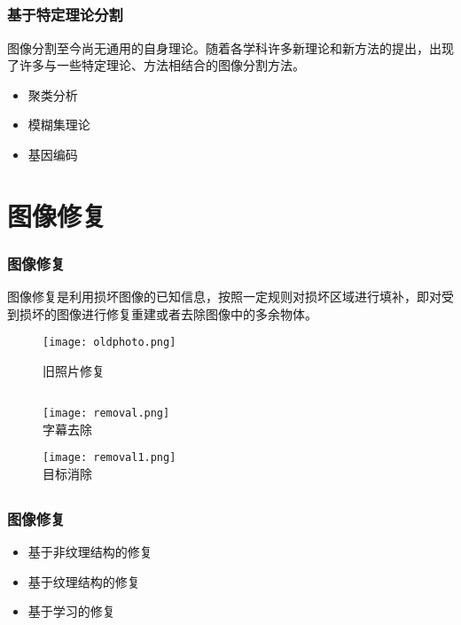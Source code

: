 \documentclass[notheorems,mathserif,table,compress]{beamer}  %
\begin{document}
\subsection{}
\begin{frame}
   \frametitle{基于特定理论分割}
\hspace{0.3in}图像分割至今尚无通用的自身理论。随着各学科许多新理论和新方法的提出，出现了许多与一些特定理论、方法相结合的图像分割方法。\\
   \begin{itemize}
   \item 聚类分析
   \item 模糊集理论
   \item 基因编码
   \end{itemize}
\end{frame}

\section{图像修复}
\begin{frame}
  \frametitle{图像修复}
  \hspace{0.3in}图像修复是利用损坏图像的已知信息，按照一定规则对损坏区域进行填补，即对受到损坏的图像进行修复重建或者去除图像中的多余物体。\\
   \begin{figure}[!ht]
   \centering
   \texttt{[image: oldphoto.png]}
   \caption{旧照片修复}
   \end{figure}
\end{frame}

\subsection{}
\begin{frame}
   \begin{figure}[!ht]
   \centering
   \texttt{[image: removal.png]}\\
   字幕去除
   \end{figure}
   \begin{figure}[!ht]
   \centering
   \texttt{[image: removal1.png]}\\
   目标消除
   \end{figure}
\end{frame}

\subsection{}
\begin{frame}
  \frametitle{图像修复}
   \begin{itemize}
   \item 基于非纹理结构的修复
   \item 基于纹理结构的修复
   \item 基于学习的修复
   \end{itemize}
\end{frame}
\end{document}
